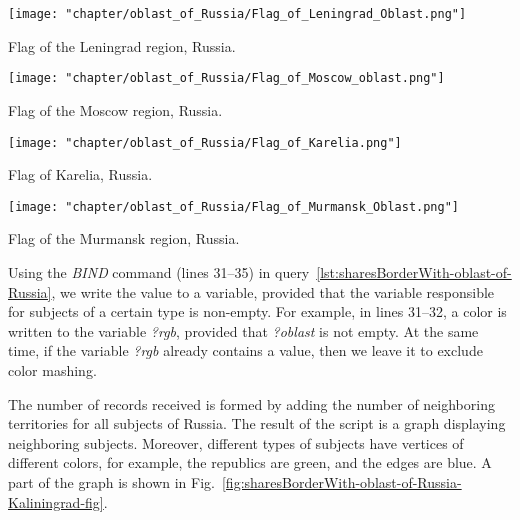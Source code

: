 \begin{marginfigure}[-10.0cm]
{
	\setlength{\fboxsep}{0pt}%
	\setlength{\fboxrule}{1pt}%
	\texttt{[image: "chapter/oblast\_of\_Russia/Flag\_of\_Leningrad\_Oblast.png"]}
}
\caption [Flag of the Leningrad region, Russia.]{Flag of the Leningrad region, Russia.}%
\label{fig:Flag_of_Leningrad_Oblast}%
\end{marginfigure}
\begin{marginfigure}[-5.0cm]
{
	\setlength{\fboxsep}{0pt}%
	\setlength{\fboxrule}{1pt}%
	\texttt{[image: "chapter/oblast\_of\_Russia/Flag\_of\_Moscow\_oblast.png"]}
}
\caption [Flag of the Moscow region, Russia.]{Flag of the Moscow region, Russia.}%
\label{fig:Flag_of_Moscow_oblast}%
\end{marginfigure}
\begin{marginfigure}[0.0cm]
{
	\setlength{\fboxsep}{0pt}%
	\setlength{\fboxrule}{1pt}%
	\texttt{[image: "chapter/oblast\_of\_Russia/Flag\_of\_Karelia.png"]}
}
\caption [Flag of Karelia, Russia.]{Flag of Karelia, Russia.}%
\label{fig:Flag_of_Karelia}%
\end{marginfigure}
\begin{marginfigure}[5.0cm]
{
	\setlength{\fboxsep}{0pt}%
	\setlength{\fboxrule}{1pt}%
	\texttt{[image: "chapter/oblast\_of\_Russia/Flag\_of\_Murmansk\_Oblast.png"]}
}
\caption [Flag of the Murmansk region, Russia.]{Flag of the Murmansk region, Russia.}%
\label{fig:Flag_of_Murmansk_Oblast}%
\end{marginfigure}

Using the \textit{BIND} command (lines 31--35) in query~\protect\ref{lst:sharesBorderWith-oblast-of-Russia}, we write the value to a variable, provided that the variable responsible for subjects of a certain type is non-empty. For example, in lines 31--32, a color is written to the variable \textit{?rgb}, provided that \textit{?oblast} is not empty. At the same time, if the variable \textit{?rgb} already contains a value, then we leave it to exclude color mashing.

The number of records received is formed by adding the number of neighboring territories for all subjects of Russia. The result of the script is a graph displaying neighboring subjects. Moreover, different types of subjects have vertices of different colors, for example, the republics are green, and the edges are blue. A part of the graph is shown in Fig.~\ref{fig:sharesBorderWith-oblast-of-Russia-Kaliningrad-fig}.

